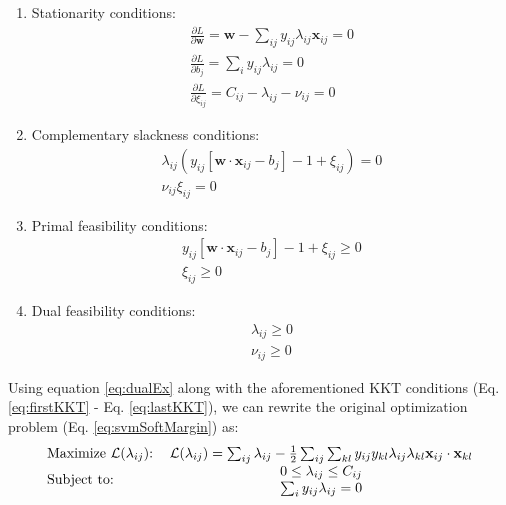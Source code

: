 \begin{enumerate}
\item Stationarity conditions:
\begin{eqnarray}
\label{eq:firstKKT}
\frac{\partial L}{\partial \mathbf{w}} = \mathbf{w} - \sum_{ij} y_{ij}\lambda_{ij}\mathbf{x}_{ij} = 0 \\
\frac{\partial L}{\partial b_j} = \sum_i y_{ij}\lambda_{ij} = 0\\
\frac{\partial L}{\partial \xi_{ij}} = C_{ij} - \lambda_{ij} - \nu_{ij}=0
\end{eqnarray}

\item Complementary slackness conditions:
\begin{eqnarray}
\lambda_{ij} \left(y_{ij} \left[ \mathbf{w}\cdot\mathbf{x}_{ij}-b_j \right]-1 +\xi_{ij} \right)=0\\
 \nu_{ij}\xi_{ij} =0
\end{eqnarray}
\item Primal feasibility conditions:
\begin{eqnarray}
y_{ij} \left[\mathbf{w}\cdot\mathbf{x}_{ij}-b_j \right]-1 +\xi_{ij} \geq 0 \\
\xi_{ij} \geq 0
\end{eqnarray}
\item Dual feasibility conditions:
\begin{eqnarray}
\lambda_{ij} \geq 0\\
 \nu_{ij} \geq 0
 \label{eq:lastKKT}
\end{eqnarray}
\end{enumerate}

Using  equation \ref{eq:dualEx} along with the aforementioned KKT conditions (Eq. \ref{eq:firstKKT} - Eq. \ref{eq:lastKKT}), we can rewrite the original optimization problem (Eq. \ref{eq:svmSoftMargin}) as:
\begin{eqnarray*}
\begin{tabular}{lc}
Maximize $\mathcal{L}(\lambda_{ij}$):&$ \mathcal{L}(\lambda_{ij})=\sum_{ij} \lambda_{ij} - \frac{1}{2}\sum_{ij}\sum_{kl}y_{ij} y_{kl} \lambda_{ij}\lambda_{kl}\mathbf{x}_{ij}\cdot\mathbf{x}_{kl}$ \\ 
\multirow{2}{*}{Subject to:}
&$0 \leq \lambda_{ij} \leq C_{ij}$\\%
&$ \sum_i y_{ij}\lambda_{ij} = 0$%
\end{tabular}
\end{eqnarray*}